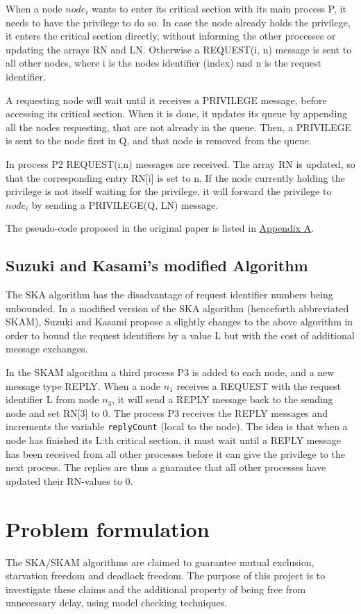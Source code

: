 \documentclass[a4paper,12pt]{article}
\begin{document}
When a node $node_i$ wants to enter its critical section with its main process P, it needs to have the privilege to do so. In case the node already holds the privilege, it enters the critical section directly, without informing the other processes or updating the arrays RN and LN. Otherwise a REQUEST(i, n) message is sent to all other nodes, where i is the nodes identifier (index) and n is the request identifier.

A requesting node will wait until it receives a PRIVILEGE message, before accessing its critical section. When it is done, it updates its queue by appending all the nodes requesting, that are not already in the queue. Then, a PRIVILEGE is sent to the node first in Q, and that node is removed from the queue.

In process P2 REQUEST(i,n) messages are received. The array RN is updated, so that the corresponding entry RN[i] is set to n. If the node currently holding the privilege is not itself waiting for the privilege, it will forward the privilege to $node_i$ by sending a PRIVILEGE(Q, LN) message.

The pseudo-code proposed in the original paper is listed in \hyperref[sec:SKA]{Appendix A}.

\subsection{Suzuki and Kasami's modified Algorithm}
The SKA algorithm has the disadvantage of request identifier numbers being unbounded. In a modified version of the SKA algorithm (henceforth abbreviated SKAM), Suzuki and Kasami propose a slightly changes to the above algorithm in order to bound the request identifiers by a value L but with the cost of additional message exchanges.

In the SKAM algorithm a third process P3 is added to each node, and a new message type REPLY. When a node $n_1$ receives a REQUEST with the request identifier L from node $n_3$, it will send a REPLY message back to the sending node and set RN[3] to 0. The process P3 receives the REPLY messages and increments the variable \texttt{replyCount} (local to the node). The idea is that when a node has finished its L:th critical section, it must wait until a REPLY message has been received from all other processes before it can give the privilege to the next process. The replies are thus a guarantee that all other processes have updated their RN-values to 0.


\section{Problem formulation}
The SKA/SKAM algorithms are claimed to guarantee mutual exclusion, starvation freedom and deadlock freedom. The purpose of this project is to investigate these claims and the additional property of being free from unnecessary delay, using model checking techniques. 
\end{document}
